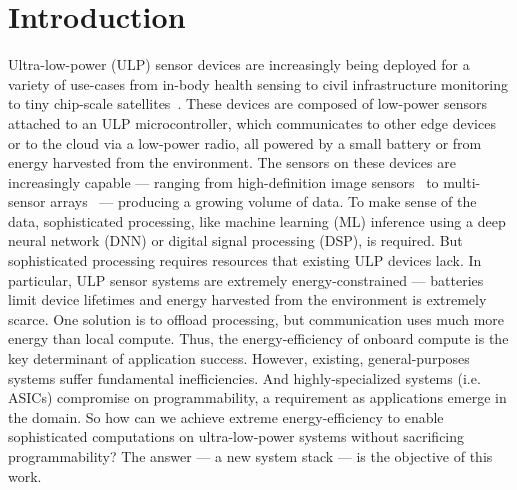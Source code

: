 \chapter{Introduction}
\label{chapter:intro}
Ultra-low-power (ULP) sensor devices are increasingly being deployed for a variety of use-cases from in-body health sensing to civil infrastructure monitoring to tiny chip-scale satellites~\cite{kicksat}.
% 
% 
These devices are composed of low-power sensors attached to an ULP microcontroller, which communicates to other edge devices or to the cloud via a low-power radio, all powered by a small battery or from energy harvested from the environment.
% 
The sensors on these devices are increasingly capable --- ranging from high-definition image sensors~\cite{naderiparizi2018towards} to multi-sensor arrays~\cite{laput2017synthetic} --- producing a growing volume of data.
% 
To make sense of the data, sophisticated processing, like machine learning (ML) inference using a deep neural network (DNN) or digital signal processing (DSP), is required.
% 
But sophisticated processing requires resources that existing ULP devices lack.
% 
In particular, ULP sensor systems are extremely energy-constrained --- batteries limit device lifetimes and energy harvested from the environment is extremely scarce.
% 
% 
One solution is to offload processing, but communication uses much more energy than local compute.
% 
Thus, the energy-efficiency of onboard compute is the key determinant of application success.
% 
However, existing, general-purposes systems suffer fundamental inefficiencies.
% 
And highly-specialized systems (i.e. ASICs) compromise on programmability, a requirement as applications emerge in the domain. 
% 
So how can we achieve extreme energy-efficiency to enable sophisticated computations on ultra-low-power systems without sacrificing programmability?
% 
% 
%
% 
The answer --- a new system stack --- is the objective of this work.

